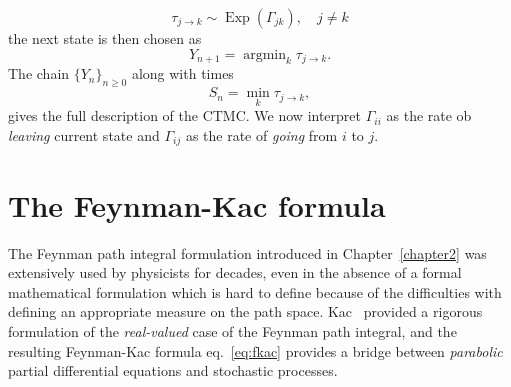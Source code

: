 \begin{equation}
	\tau_{j \rightarrow k} \sim \operatorname{Exp}(\Gamma_{jk}), \quad j \neq k
\end{equation}
the next state is then chosen as
\begin{equation}
	Y_{n+1} = \operatorname{argmin}_{k} \tau_{j \rightarrow k}.
\end{equation}
The chain $\{Y_n\}_{n\geq0}$ along with times 
\begin{equation}
	S_{n} = \min _{k} \tau_{j \rightarrow k},
\end{equation}
gives the full description of the CTMC. We now interpret $\Gamma_{ii}$ as the rate ob \emph{leaving} current state and $\Gamma_{i j}$ as the rate of \emph{going} from $i$ to $j$.

\section{The Feynman-Kac formula}
\label{subsec:fk-fk}
The Feynman path integral formulation introduced in Chapter~\ref{chapter2} was extensively used by physicists for decades, even in the absence of a formal mathematical formulation which is hard to define because of the difficulties with defining an appropriate measure on the path space. Kac~\cite{kac1949distributions} provided a rigorous formulation of the \textit{real-valued} case of the Feynman path integral, and the resulting {Feynman-Kac formula} eq.~\eqref{eq:fkac} provides a bridge between \emph{parabolic} partial differential equations and stochastic processes. 

